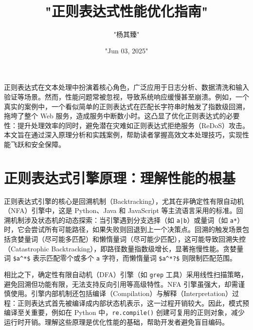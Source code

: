 \title{"正则表达式性能优化指南"}
\author{"杨其臻"}
\date{"Jun 03, 2025"}
\maketitle
正则表达式在文本处理中扮演着核心角色，广泛应用于日志分析、数据清洗和输入验证等场景。然而，性能问题常被忽视，导致系统响应缓慢甚至崩溃。例如，一个真实的案例中，一个看似简单的正则表达式在匹配长字符串时触发了指数级回溯，拖垮了整个 Web 服务，造成服务中断数小时。这凸显了优化正则表达式的必要性：提升处理效率的同时，避免潜在灾难如正则表达式拒绝服务（ReDoS）攻击。本文旨在通过深入原理分析和实践案例，帮助读者掌握高效文本处理技巧，实现性能飞跃和安全保障。\par
\chapter{正则表达式引擎原理：理解性能的根基}
正则表达式引擎的核心是回溯机制（Backtracking），尤其在非确定性有限自动机（NFA）引擎中，这是 Python、Java 和 JavaScript 等主流语言采用的标准。回溯机制涉及状态机的动态探索：当引擎遇到分支选择（如 \texttt{a|b}）或量词（如 \texttt{a*}）时，它会尝试所有可能路径，如果失败则回退到上一个决策点。回溯的触发场景包括贪婪量词（尽可能多匹配）和懒惰量词（尽可能少匹配），这可能导致回溯失控（Catastrophic Backtracking），即路径数量指数级增长，显著拖慢性能。贪婪量词 \texttt{\${}a\^{}*\${}} 表示匹配零个或多个 \texttt{a} 字符，而懒惰量词 \texttt{\${}a\^{}*?\${}} 则限制匹配范围。\par
相比之下，确定性有限自动机（DFA）引擎（如 \texttt{grep} 工具）采用线性扫描策略，避免回溯但功能有限，无法支持反向引用等高级特性。NFA 引擎虽强大，却需谨慎使用。引擎内部机制还包括编译（Compilation）与解释（Interpretation）过程：正则表达式首先被编译成内部状态机表示，这一过程开销较大。因此，模式预编译至关重要，例如在 Python 中，\texttt{re.compile()} 创建可复用的正则对象，减少运行时开销。理解这些原理是优化性能的基础，帮助开发者避免盲目编码。\par
